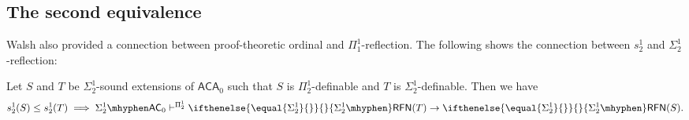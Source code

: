 \documentclass{mhkr}
\newcommand{\added}[1]{#1}
\newcommand{\RFN}[1][]{\ifthenelse{\equal{#1}{}}{}{#1\mhyphen}\mathsf{RFN}}
\newcommand{\AC}{\mathsf{AC}}
\newcommand{\ACA}{\mathsf{ACA}}
\begin{document}
\subsection{The second equivalence}
\added{Walsh} \cite{Walsh2023characterizations} also provided a connection between proof-theoretic ordinal and $\Pi^1_1$-reflection. The following shows the connection between $s^1_2$ and $\Sigma^1_2$-reflection:
\begin{proposition} \label{Proposition: Second equivalence LtoR for Sigma 1 2}
    Let $S$ and $T$ be $\Sigma^1_2$-sound extensions of $\ACA_0$ such that $S$ is $\Pi^1_2$-definable and $T$ is $\Sigma^1_2$-definable.
    Then we have
    \begin{equation} \label{Formula: Second equivalence LtoR}
        s^1_2(S)\le s^1_2(T)\implies \Sigma^1_2\mhyphen \AC_0\vdash^{\Pi^1_2} \RFN[\Sigma^1_2](T)\to \RFN[\Sigma^1_2](S).
    \end{equation}
\end{proposition}
\end{document}
